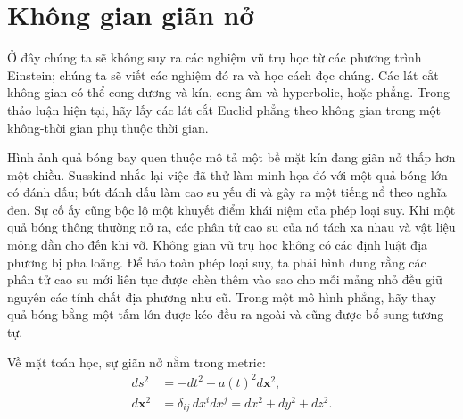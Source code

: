 \begin{classroomqa}
\end{classroomqa}

\section{Không gian giãn nở}

Ở đây chúng ta sẽ không suy ra các nghiệm vũ trụ học từ các phương trình Einstein; chúng ta sẽ viết các nghiệm đó ra và học cách đọc chúng. Các lát cắt không gian có thể cong dương và kín, cong âm và hyperbolic, hoặc phẳng. Trong thảo luận hiện tại, hãy lấy các lát cắt Euclid phẳng theo không gian trong một không-thời gian phụ thuộc thời gian.

\begin{classroomqa}
\end{classroomqa}

Hình ảnh quả bóng bay quen thuộc mô tả một bề mặt kín đang giãn nở thấp hơn một chiều. Susskind nhắc lại việc đã thử làm minh họa đó với một quả bóng lớn có đánh dấu; bút đánh dấu làm cao su yếu đi và gây ra một tiếng nổ theo nghĩa đen. Sự cố ấy cũng bộc lộ một khuyết điểm khái niệm của phép loại suy. Khi một quả bóng thông thường nở ra, các phân tử cao su của nó tách xa nhau và vật liệu mỏng dần cho đến khi vỡ. Không gian vũ trụ học không có các định luật địa phương bị pha loãng. Để bảo toàn phép loại suy, ta phải hình dung rằng các phân tử cao su mới liên tục được chèn thêm vào sao cho mỗi mảng nhỏ đều giữ nguyên các tính chất địa phương như cũ. Trong một mô hình phẳng, hãy thay quả bóng bằng một tấm lớn được kéo đều ra ngoài và cũng được bổ sung tương tự.

Về mặt toán học, sự giãn nở nằm trong metric:
\begin{equation}
\begin{aligned}
ds^2&=-dt^2+a(t)^2d\mathbf{x}^2,\\
d\mathbf{x}^2&=\delta_{ij}\,dx^i dx^j
=dx^2+dy^2+dz^2.
\end{aligned}
\label{eq:l07-frw-metric}
\end{equation}

